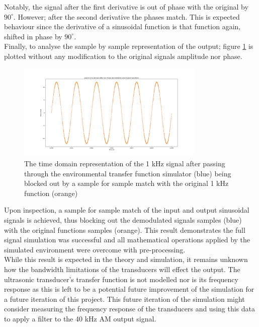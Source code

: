 Notably, the signal after the first derivative is out of phase with the original by $90^\circ$. However; after the second derivative the phases match. This is expected behaviour since the derivative of a sinusoidal function is that function again, shifted in phase by $90^\circ$.\\
Finally, to analyse the sample by sample representation of the output; figure \ref{fig:youtfinal} is plotted without any modification to the original signals amplitude nor phase.
\begin{figure}[ht!]
    \centering
    \includegraphics[width=0.8\textwidth]{Figures/SigSimulation/youtfulldemod.png}
    \caption{The time domain representation of the 1 kHz signal after passing through the environmental transfer function simulator (blue) being blocked out by a sample for sample match with the original 1 kHz function (orange)}
    \label{fig:youtfinal}
\end{figure}
\newpage
Upon inspection, a sample for sample match of the input and output sinusoidal signals is achieved, thus blocking out the demodulated signals samples (blue) with the original functions samples (orange). This result demonstrates the full signal simulation was successful and all mathematical operations applied by the simulated environment were overcome with pre-processing.\\
While this result is expected in the theory and simulation, it remains unknown how the bandwidth limitations of the transducers will effect the output. The ultrasonic transducer's transfer function is not modelled nor is its frequency response as this is left to be a potential future improvement of the simulation for a future iteration of this project. This future iteration of the simulation might consider measuring the frequency response of the transducers and using this data to apply a filter to the 40 kHz AM output signal.
